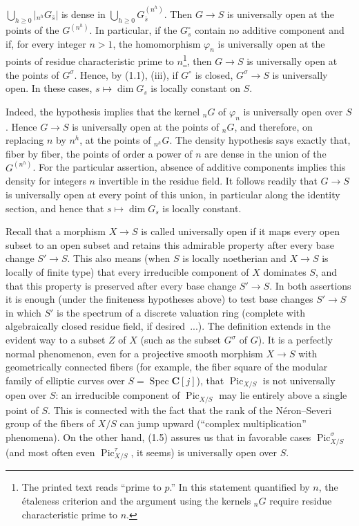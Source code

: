 $\bigcup_{h\geq0}|{}_{n^h}G_{\bar s}|$ is dense in
$\bigcup_{h\geq0}G_{\bar s}^{(n^h)}$. Then
$G\longrightarrow S$ is universally open at the points of the
$G^{(n^h)}$. In particular, if the $G_s^\circ$ contain no additive component
and if, for every integer $n>1$, the homomorphism $\varphi_n$ is universally
open at the points of residue characteristic prime to $n$\footnote{The printed
text reads “prime to $p$.” In this statement quantified by $n$, the étaleness
criterion and the argument using the kernels ${}_nG$ require residue
characteristic prime to $n$.}, then $G\longrightarrow S$ is universally open
at the points of $G^\sigma$. Hence, by (1.1), (iii), if $G^\circ$ is closed,
$G^\sigma\longrightarrow S$ is universally open. In these cases,
$s\longmapsto\dim G_s$ is locally constant on $S$.

Indeed, the hypothesis implies that the kernel ${}_nG$ of $\varphi_n$ is
universally open over $S$. Hence $G\longrightarrow S$ is universally open at
the points of ${}_nG$, and therefore, on replacing $n$ by $n^h$, at the points
of ${}_{n^h}G$. The density hypothesis says exactly that, fiber by fiber, the points of order
a power of $n$ are dense in the union of the $G^{(n^h)}$. For the particular
assertion, absence of additive components implies this density for integers
$n$ invertible in the residue field. It follows readily that $G\longrightarrow S$ is universally open
at every point of this union, in particular along the identity section, and
hence that $s\longmapsto\dim G_s$ is locally constant.

 Recall that a morphism $X\longrightarrow S$ is called
universally open if it maps every open subset to an open subset and retains
this admirable property after every base change $S'\longrightarrow S$. This
also means (when $S$ is locally noetherian and $X\longrightarrow S$ is locally
of finite type) that every irreducible component of $X$ dominates $S$, and
that this property is preserved after every base change
$S'\longrightarrow S$. In both assertions it is enough (under the finiteness
hypotheses above) to test base changes $S'\longrightarrow S$ in which $S'$ is
the spectrum of a discrete valuation ring (complete with algebraically closed
residue field, if desired~...). The definition extends in the evident way to a
subset $Z$ of $X$ (such as the subset $G^\sigma$ of $G$). It is a perfectly
normal phenomenon, even for a projective smooth morphism
$X\longrightarrow S$ with geometrically connected fibers (for example, the
fiber square of the modular family of elliptic curves over
$S=\operatorname{Spec}\mathbf C[j]$), that $\operatorname{Pic}_{X/S}$ is not
universally open over $S$: an irreducible component of
$\operatorname{Pic}_{X/S}$ may lie entirely above a single point of $S$. This
is connected with the fact that the rank of the Néron--Severi group of the
fibers of $X/S$ can jump upward (“complex multiplication” phenomena). On the
other hand, (1.5) assures us that in favorable cases
$\operatorname{Pic}_{X/S}^\sigma$ (and most often even
$\operatorname{Pic}_{X/S}^\tau$, it seems) is universally open over $S$.

